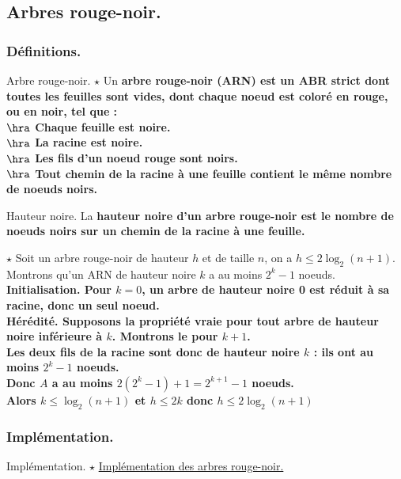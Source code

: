 \documentclass[french, 11pt]{article}
\begin{document}
\subsection{Arbres rouge-noir.}
\subsubsection{Définitions.}
\begin{defi}{Arbre rouge-noir. $\star$}{}
    Un \bf{arbre rouge-noir (ARN)} est un ABR strict dont toutes les feuilles sont vides, dont chaque noeud est coloré en rouge, ou en noir, tel que :\\
    $\hra$ Chaque feuille est noire.\\
    $\hra$ La racine est noire.\\
    $\hra$ Les fils d'un noeud rouge sont noirs.\\
    $\hra$ Tout chemin de la racine à une feuille contient le même nombre de noeuds noirs.
\end{defi}

\begin{defi}{Hauteur noire.}{}
    La \bf{hauteur noire} d'un arbre rouge-noir est le nombre de noeuds noirs sur un chemin de la racine à une feuille.
\end{defi}

\begin{prop}{$\star$}{}
    Soit un arbre rouge-noir de hauteur $h$ et de taille $n$, on a $h\leq 2\log_2(n+1)$.
    \tcblower
    Montrons qu'un ARN de hauteur noire $k$ a au moins $2^k-1$ noeuds.\\
    \bf{Initialisation.} Pour $k=0$, un arbre de hauteur noire 0 est réduit à sa racine, donc un seul noeud.\\
    \bf{Hérédité.} Supposons la propriété vraie pour tout arbre de hauteur noire inférieure à $k$. Montrons le pour $k+1$.\\
    Les deux fils de la racine sont donc de hauteur noire $k$ : ils ont au moins $2^k-1$ noeuds.\\
    Donc $A$ a au moins $2(2^k-1)+1=2^{k+1}-1$ noeuds.\\
    Alors $k \leq \log_2(n+1)$ et $h\leq2k$ donc $h\leq2\log_2(n+1)$
\end{prop}

\subsubsection{Implémentation.}
\begin{thm}{Implémentation. $\star$}{}
    \href{https://anthonylick.com/wp-content/uploads/mp2i\_chap16.pdf}{Implémentation des arbres rouge-noir.}
\end{thm}
\end{document}
